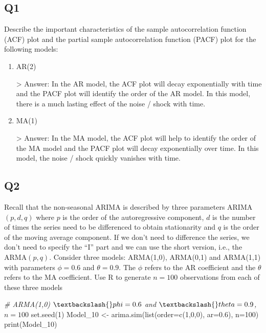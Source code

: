 \documentclass[
]{article}
\newenvironment{Shaded}{\begin{snugshade}}{\end{snugshade}}
\newcommand{\AttributeTok}[1]{\textcolor[rgb]{0.77,0.63,0.00}{#1}}
\newcommand{\CommentTok}[1]{\textcolor[rgb]{0.56,0.35,0.01}{\textit{#1}}}
\newcommand{\DecValTok}[1]{\textcolor[rgb]{0.00,0.00,0.81}{#1}}
\newcommand{\FloatTok}[1]{\textcolor[rgb]{0.00,0.00,0.81}{#1}}
\newcommand{\FunctionTok}[1]{\textcolor[rgb]{0.00,0.00,0.00}{#1}}
\newcommand{\NormalTok}[1]{#1}
\newcommand{\OtherTok}[1]{\textcolor[rgb]{0.56,0.35,0.01}{#1}}
\begin{document}
\hypertarget{q1}{%
\subsection{Q1}\label{q1}}

Describe the important characteristics of the sample autocorrelation
function (ACF) plot and the partial sample autocorrelation function
(PACF) plot for the following models:

\begin{enumerate}[label=(\alph*)]

\item AR(2)

> Answer: In the AR model, the ACF plot will decay exponentially with time and the PACF plot will identify the order of the AR model. In this model, there is a much lasting effect of the noise / shock with time.

\item MA(1)

> Answer: In the MA model, the ACF plot will help to identify the order of the MA model and the PACF plot will decay exponentially over time. In this model, the noise / shock quickly vanishes with time. 

\end{enumerate}

\hypertarget{q2}{%
\subsection{Q2}\label{q2}}

Recall that the non-seasonal ARIMA is described by three parameters
ARIMA\((p,d,q)\) where \(p\) is the order of the autoregressive
component, \(d\) is the number of times the series need to be
differenced to obtain stationarity and \(q\) is the order of the moving
average component. If we don't need to difference the series, we don't
need to specify the ``I'' part and we can use the short version, i.e.,
the ARMA\((p,q)\). Consider three models: ARMA(1,0), ARMA(0,1) and
ARMA(1,1) with parameters \(\phi=0.6\) and \(\theta= 0.9\). The \(\phi\)
refers to the AR coefficient and the \(\theta\) refers to the MA
coefficient. Use R to generate \(n=100\) observations from each of these
three models

\begin{Shaded}
\begin{Highlighting}[]
\CommentTok{\# ARMA(1,0) $\textbackslash{}phi=0.6$ and $\textbackslash{}theta= 0.9$, $n=100$}
\FunctionTok{set.seed}\NormalTok{(}\DecValTok{1}\NormalTok{)}
\NormalTok{Model\_10 }\OtherTok{\textless{}{-}} \FunctionTok{arima.sim}\NormalTok{(}\FunctionTok{list}\NormalTok{(}\AttributeTok{order=}\FunctionTok{c}\NormalTok{(}\DecValTok{1}\NormalTok{,}\DecValTok{0}\NormalTok{,}\DecValTok{0}\NormalTok{), }\AttributeTok{ar=}\FloatTok{0.6}\NormalTok{), }\AttributeTok{n=}\DecValTok{100}\NormalTok{)}
\FunctionTok{print}\NormalTok{(Model\_10)}
\end{Highlighting}
\end{Shaded}
\end{document}
